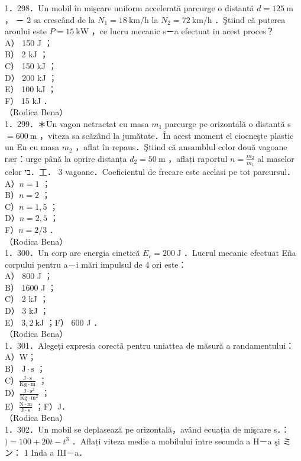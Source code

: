{1．298．Un mobil în mişcare uniform accelerată parcurge o distantă $d=125 \mathrm{~m}$ ， － 2 sa crescând de la $N_{1}=18 \mathrm{~km} / \mathrm{h}$ la $N_{2}=72 \mathrm{~km} / \mathrm{h}$ ．Ştiind că puterea aroului este $P=15 \mathrm{~kW}$ ，ce lucru mecanic s－a efectuat in acest proces？\\
A） 150 J ；\\
B） 2 kJ ；\\
C） 150 kJ ；\\
D） 200 kJ ；\\
E） 100 kJ ；\\
F） 15 kJ ．\\
（Rodica Bena）\\
1．299．＊Un vagon netractat cu masa $m_{1}$ parcurge pe orizontală o distantă s $=600 \mathrm{~m}$ ，viteza sa scăzând la jumătate．În acest moment el ciocneşte plastic un En cu masa $m_{2}$ ，aflat în repaus．Ştiind că ansamblul celor două vagoane гæг：urge până la oprire distanța $d_{2}=50 \mathrm{~m}$ ，aflați raportul $n=\frac{m_{2}}{m_{1}}$ al maselor celor בי．工． 3 vagoane．Coeficientul de frecare este acelasi pe tot parcursul．\\
A）$n=1$ ；\\
B）$n=2$ ；\\
C）$n=1,5$ ；\\
D）$n=2,5$ ；\\
F）$n=2 / 3$ ．\\
（Rodica Bena）\\
1．300．Un corp are energia cinetică $E_{c}=200 \mathrm{~J}$ ．Lucrul mecanic efectuat Eña corpului pentru a－i mări impulsul de 4 ori este：\\
A） 800 J ；\\
B） 1600 J ；\\
C） 2 kJ ；\\
D） 3 kJ ；\\
E） $3,2 \mathrm{~kJ}$ ；F） 600 J ．\\
（Rodica Bena）\\
1．301．Alegeți expresia corectã pentru uniattea de măsură a randamentului：\\
A）W；\\
B） $\mathrm{J} \cdot \mathrm{s}$ ；\\
C）$\frac{\mathrm{J} \cdot \mathrm{s}}{\mathrm{Kg} \cdot \mathrm{m}}$ ；\\
D）$\frac{\mathrm{J} \cdot \mathrm{s}^{2}}{\mathrm{Kg} \cdot \mathrm{m}^{2}}$ ；\\
E）$\frac{\mathrm{N} \cdot \mathrm{m}}{\mathrm{J} \cdot s}$ ；F）J．\\
（Rodica Bena）\\
1．302．Un mobil se deplasează pe orizontală，având ecuația de mişcare s．：$)=100+20 t-t^{3}$ ．Aflați viteza medie a mobilului între secunda a H－a şi ミン： 1 Inda a III－a．

}
